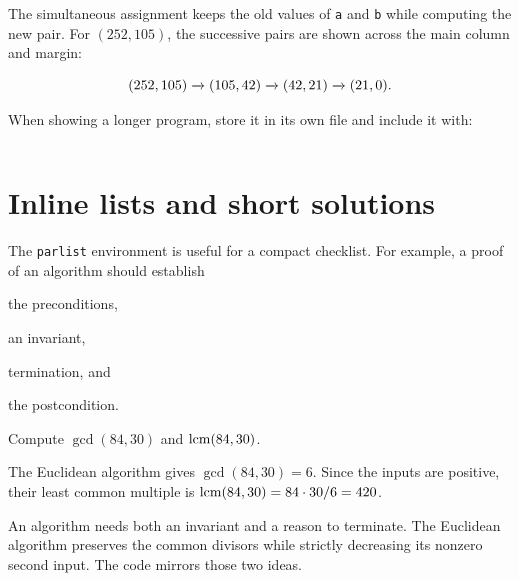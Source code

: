 \documentclass[../../main.tex]{subfiles}
\begin{document}
The simultaneous assignment keeps the old values of \texttt{a} and
\texttt{b} while computing the new pair. For $(252,105)$, the successive
pairs are shown across the main column and margin:
\begin{fullwidth}
\[
  (252,105)\xrightarrow{}(105,42)\xrightarrow{}(42,21)\xrightarrow{}(21,0).
\]
\end{fullwidth}
When showing a longer program, store it in its own file and include it with:
\begin{lstlisting}[language={[LaTeX]TeX}]

\end{lstlisting}

\section{Inline lists and short solutions}
The \texttt{parlist} environment is useful for a compact checklist. For
example, a proof of an algorithm should establish
\begin{parlist}
  \item the preconditions,
  \item an invariant,
  \item termination, and
  \item the postcondition.
\end{parlist}

\begin{exercise}\label{ex:gcd-lcm}
Compute $\gcd(84,30)$ and $\operatorname*{lcm}(84,30)$.
\end{exercise}
\begin{soln}
The Euclidean algorithm gives $\gcd(84,30)=6$. Since the inputs are
positive, their least common multiple is
$\operatorname*{lcm}(84,30)=84\cdot30/6=420$.
\end{soln}

\begin{recap}
An algorithm needs both an invariant and a reason to terminate.
The Euclidean algorithm preserves the common divisors while strictly
decreasing its nonzero second input. The code mirrors those two ideas.
\end{recap}
\end{document}
